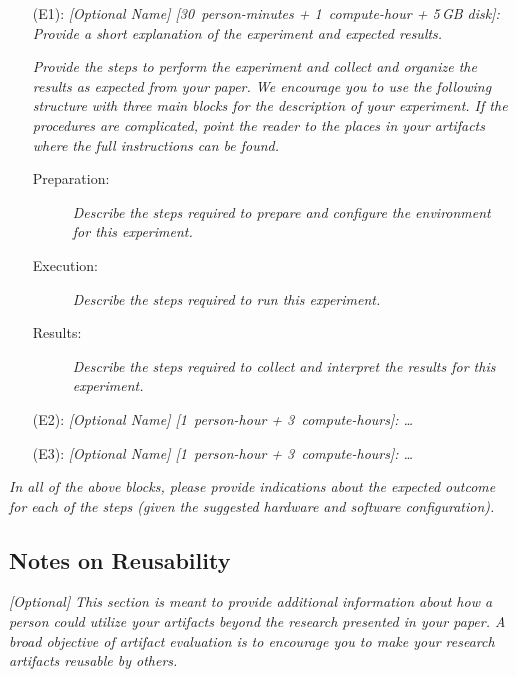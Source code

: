 \documentclass[sigconf]{acmart}
\begin{document}
	\bigskip
	\begin{itemize}
		\item[(E1):]
		\emph{[Optional Name] [30~person-minutes + 1~compute-hour + 5\,GB
			disk]: Provide a short explanation of the experiment and expected
			results.}
		
		\emph{Provide the steps to perform the experiment and collect and
			organize the results as expected from your paper.  We encourage you
			to use the following structure with three main blocks for the
			description of your experiment.  If the procedures are complicated,
			point the reader to the places in your artifacts where the full
			instructions can be found.}
		
		\begin{description}
			\item[Preparation:] \emph{Describe the steps required to prepare and
				configure the environment for this experiment.}
			
			\item[Execution:] \emph{Describe the steps required to run this
				experiment.}
			
			\item[Results:] \emph{Describe the steps required to collect and
				interpret the results for this experiment.}
		\end{description}
		
		\item[(E2):] \emph{[Optional Name] [1~person-hour + 3~compute-hours]: \ldots}
		
		\item[(E3):] \emph{[Optional Name] [1~person-hour + 3~compute-hours]: \ldots}
	\end{itemize}
	\bigskip
	
	\emph{In all of the above blocks, please provide indications about the
		expected outcome for each of the steps (given the suggested hardware
		and software configuration).}
	
	
	\subsection{Notes on Reusability}
	
	\emph{[Optional]}
	\emph{This section is meant to provide additional information about
		how a person could utilize your artifacts beyond the research
		presented in your paper.  A broad objective of artifact evaluation is
		to encourage you to make your research artifacts reusable by others.}
	
\end{document}

